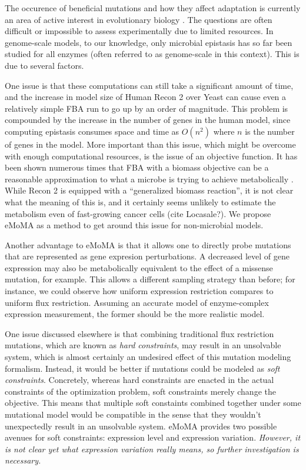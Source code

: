 \documentclass[phd,tocprelim]{cornell}
\begin{document}
The occurence of beneficial mutations and how they affect adaptation is currently an area of active
interest in evolutionary biology \cite{Chou2011} \cite{Weinreich2006}. The questions are often difficult
or impossible to assess experimentally due to limited resources.  In genome-scale models, to our knowledge,
only microbial epistasis has so far been studied for all enzymes (often referred to as genome-scale 
in this context). This is due to several factors.

One issue is that these computations can still take a significant amount of time, and the increase in model
size of Human Recon 2 over Yeast can cause even a relatively simple FBA run to go up by an order of magnitude.
This problem is compounded by the increase in the number of genes in the human model, since computing epistasis
consumes space and time as $O(n^2)$ where $n$ is the number of genes in the model. More important than this issue,
which might be overcome with enough computational resources, is the issue of an objective function. It has been shown
numerous times that FBA with a biomass objective can be a reasonable approximation to what a microbe is trying to 
achieve metabolically \cite{Schuetz2012} \cite{Fong2004} \cite{Varma1994} . While Recon 2 is equipped with a ``generalized biomass reaction'', it is not clear
what the meaning of this is, and it certainly seems unlikely to estimate the metabolism even of fast-growing cancer
cells (cite Locasale?). We propose eMoMA as a method to get around this issue for non-microbial models.

Another advantage to eMoMA is that it allows one to directly probe mutations that are represented as gene expresion
perturbations. A decreased level of gene expression may also be metabolically equivalent to the effect of a missense
mutation, for example. This allows a different sampling strategy than before; for instance, we could observe how uniform 
expression restriction compares to uniform flux restriction\cite{Xu2012}. Assuming an accurate model of enzyme-complex
expression measurement, the former should be the more realistic model.

One issue discussed elsewhere is that combining traditional flux restriction mutations, which are known as 
\emph{hard constraints}, may result in an unsolvable system, which is almost certainly an undesired effect
of this mutation modeling formalism. Instead, it would be better if mutations could be modeled as 
\emph{soft constraints}. Concretely, whereas hard constraints are enacted in the actual constraints of the 
optimization problem, soft constraints merely change the objective. This means that multiple soft constaints
combined together under some mutational model would be compatible in the sense that they wouldn't unexpectedly
result in an unsolvable system. eMoMA provides two possible avenues for soft constraints: expression level 
and expression variation. \emph{However, it is not clear yet what expression variation really means, so further
investigation is necessary.}
\end{document}
